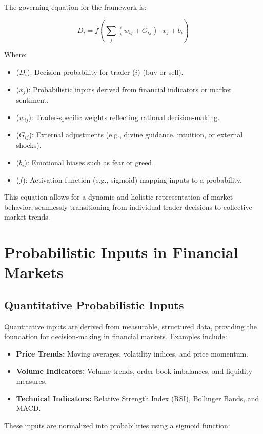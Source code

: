 \documentclass[a4]{article}
\newcommand{\bn}{\bigskip\noindent}
\begin{document}
\bn
The governing equation for the framework is:

$$
 D_i = f\left(\sum_{j} (w_{ij} + G_{ij}) \cdot x_j + b_i\right)
$$

Where:

\begin{itemize}
\item  ($D_i$): Decision probability for trader ($i$) (buy or sell).
\item ($x_j$): Probabilistic inputs derived from financial indicators or market sentiment.
\item ($w_{ij}$): Trader-specific weights reflecting rational decision-making.
\item  ($G_{ij}$): External adjustments (e.g., divine guidance, intuition, or external shocks).
\item ($b_i$): Emotional biases such as fear or greed.
\item ($f$): Activation function (e.g., sigmoid) mapping inputs to a probability.
\end{itemize}

This equation allows for a dynamic and holistic representation of market behavior, seamlessly transitioning from individual trader decisions to collective market trends.

\section{Probabilistic Inputs in Financial Markets}

\subsection{Quantitative Probabilistic Inputs} 
Quantitative inputs are derived from measurable, structured data, providing the foundation for decision-making in financial markets. Examples include:


\begin{itemize}
\item  {\bf Price Trends:}  Moving averages, volatility indices, and price momentum.
\item {\bf Volume Indicators:}  Volume trends, order book imbalances, and liquidity measures.
\item {\bf Technical Indicators:}  Relative Strength Index (RSI), Bollinger Bands, and MACD.
\end{itemize}

These inputs are normalized into probabilities using a sigmoid function:
\end{document}
